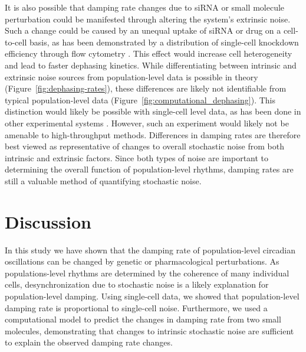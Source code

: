 \documentclass[11pt, letterpaper]{article}
\begin{document}
It is also possible that damping rate changes due to siRNA or small molecule perturbation could be manifested through altering the system's extrinsic noise.
Such a change could be caused by an unequal uptake of siRNA or drug on a cell-to-cell basis, as has been demonstrated by a distribution of single-cell knockdown efficiency through flow cytometry \cite{Mousses2003}.
This effect would increase cell heterogeneity and lead to faster dephasing kinetics.
While differentiating between intrinsic and extrinsic noise sources from population-level data is possible in theory (Figure~\ref{fig:dephasing-rates}), these differences are likely not identifiable from typical population-level data (Figure~\ref{fig:computational_dephasing}).
This distinction would likely be possible with single-cell level data, as has been done in other experimental systems \cite{Elowitz2002}.
However, such an experiment would likely not be amenable to high-throughput methods.
Differences in damping rates are therefore best viewed as representative of changes to overall stochastic noise from both intrinsic and extrinsic factors.
Since both types of noise are important to determining the overall function of population-level rhythms, damping rates are still a valuable method of quantifying stochastic noise.


\section*{Discussion}


In this study we have shown that the damping rate of population-level circadian oscillations can be changed by genetic or pharmacological perturbations.
As populations-level rhythms are determined by the coherence of many individual cells, desynchronization due to stochastic noise is a likely explanation for population-level damping.
Using single-cell data, we showed that population-level damping rate is proportional to single-cell noise.
Furthermore, we used a computational model to predict the changes in damping rate from two small molecules, demonstrating that changes to intrinsic stochastic noise are sufficient to explain the observed damping rate changes.
\end{document}
